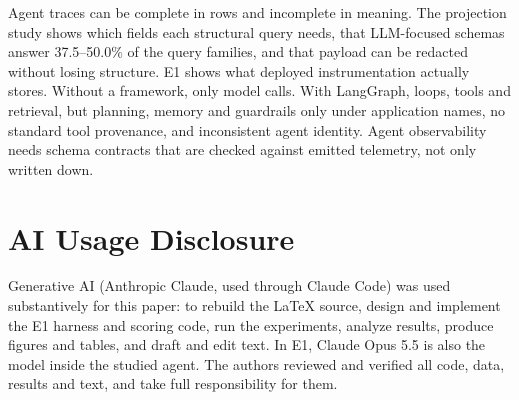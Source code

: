 \documentclass[conference]{IEEEtran}
\begin{document}
Agent traces can be complete in rows and incomplete in meaning. The
projection study shows which fields each structural query needs, that
LLM-focused schemas answer 37.5--50.0\% of the query families, and that
payload can be redacted without losing structure. E1 shows what
deployed instrumentation actually stores. Without a framework, only
model calls. With LangGraph, loops, tools and retrieval, but planning,
memory and guardrails only under application names, no standard tool
provenance, and inconsistent agent identity. Agent observability needs
schema contracts that are checked against emitted telemetry, not only
written down.

\section*{AI Usage Disclosure}
Generative AI (Anthropic Claude, used through Claude Code) was used
substantively for this paper: to rebuild the LaTeX source, design and
implement the E1 harness and scoring code, run the experiments, analyze
results, produce figures and tables, and draft and edit text. In E1,
Claude Opus 5.5 is also the model inside the studied agent. The authors
reviewed and verified all code, data, results and text, and take full
responsibility for them.
\end{document}
